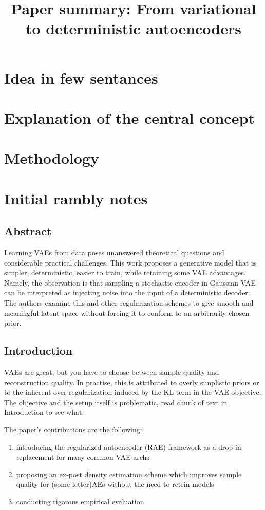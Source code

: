 \documentclass{article}
\title{Paper summary: From variational to deterministic autoencoders}
\begin{document}
\maketitle


\section{Idea in few sentances}


\section{Explanation of the central concept}


\section{Methodology}


\section{Initial rambly notes}

\subsection{Abstract}
Learning VAEs from data poses unanswered theoretical questions and considerable practical challenges.
This work proposes a generative model that is simpler, deterministic, easier to train,
while retaining some VAE advantages.
Namely, the observation is that sampling a stochastic encoder in Gaussian VAE can be interpreted as injecting
noise into the input of a deterministic decoder.
The authors examine this and other regularization schemes to give smooth and meaningful latent
space without forcing it to conform to an arbitrarily chosen prior.


\subsection{Introduction}
VAEs are great, but you have to choose between sample quality and reconstruction quality.
In practise, this is attributed to overly simplistic priors or to the inherent over-regularization
induced by the KL term in the VAE objective.
The objective and the setup itself is problematic, read chunk of text in Introduction to see what.

The paper's contributions are the following:
\begin{enumerate}
		\item introducing the regularized autoencoder (RAE) framework as a drop-in replacement for many common VAE archs
		\item proposing an ex-post density estimation scheme which improves sample quality for (some letter)AEs
				without the need to retrin models
		\item conducting rigorous empirical evaluation
\end{enumerate}
\end{document}

